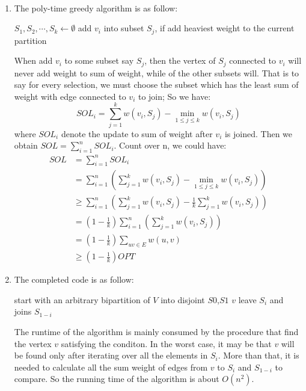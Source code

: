 \documentclass[12pt]{article}
\newenvironment{solution}[2][Solution]{\begin{trivlist}
\item[\hskip \labelsep {\bfseries #1}\hskip \labelsep {\bfseries #2.}]}{\end{trivlist}}
\begin{document}
\begin{solution}{4}
    ~
    \begin{enumerate}
        \item  The poly-time greedy algorithm is as follow:

        \begin{algorithm}
        $S_1,S_2,\cdots,S_k \gets \emptyset$ \;
         {
            add $v_i$ into subset $S_j$, if add heaviest weight to the current partition
        }
       \end{algorithm}
       When add $v_i$ to some subset say $S_j$, then the vertex of $S_j$ connected to $v_i$ will never add weight to sum of weight, while of the other
       subsets will.
       That is to say for every selection, we must choose the subset which has the least sum of weight with edge connected to $v_i$ to join; So we have:
       \[SOL_i = \sum_{j=1}^kw(v_i,S_j)-\min_{1\le j \le k}w(v_i, S_j)\]
       where $SOL_i$ denote the update to sum of weight after $v_i$ is joined. Then we obtain $SOL = \sum_{i=1}^nSOL_i$. Count over n, we could have:
       \begin{align*}
           SOL & = \sum_{i=1}^nSOL_i \\
           & = \sum_{i=1}^n(\sum_{j=1}^kw(v_i,S_j)-\min_{1\le j \le k}w(v_i, S_j)) \\
           & \ge \sum_{i=1}^n(\sum_{j=1}^kw(v_i,S_j)-\frac1k\sum_{j=1}^kw(v_i,S_j)) \\
           & = (1-\frac1k)\sum_{i=1}^n(\sum_{j=1}^kw(v_i,S_j)) \\
           & = (1-\frac1k)\sum_{uv \in E}w(u,v) \\
           & \ge (1-\frac1k)OPT
       \end{align*}
       \item The completed code is as follow:
       
       \begin{algorithm}
        start with an arbitrary bipartition of $V$ into disjoint $S0$,$S1$\;
         {
             {
                $v$ leave $S_i$ and joins $S_{1-i}$\;
                \Continue
            }
        }
       \end{algorithm}
       The runtime of the algorithm is mainly consumed by the procedure that find the vertex $v$ satisfying the conditon.
       In the worst case, it may be that $v$ will be found only after iterating over all the elements in $S_i$. More than
       that, it is needed to calculate all the sum weight of edges from $v$ to $S_i$ and $S_{1-i}$ to compare. So the
       running time of the algorithm is about $O(n^2)$.


\end{enumerate}
\end{solution}
\end{document}
